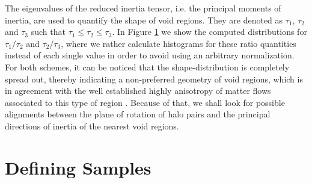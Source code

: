 \documentclass[a4,useAMS,usenatbib,usegraphicx]{latex/mn2e}
\begin{document}
\begin{flushleft}
\begin{figure}
\begin{center}

  \label{fig:distro_inertia}
  \vspace{0.1 cm}

\end{center}
\end{figure}
\end{flushleft}



The eigenvalues of the reduced inertia tensor, i.e. the principal moments
of inertia, are used to quantify the shape of void regions. They are 
denoted as $\tau_1$, $\tau_2$ and $\tau_3$ such that $\tau_1 \leq \tau_2
\leq \tau_3$. In Figure \ref{fig:distro_inertia} we show the computed
distributions for $\tau_1/\tau_2$ and $\tau_2/\tau_3$, where we rather 
calculate histograms for these ratio quantities instead of each single 
value in order to avoid using an arbitrary normalization. For both schemes, 
it can be noticed that the shape-distribution is completely spread out, 
thereby indicating a non-preferred geometry of void regions, which is in 
agreement with the well established highly anisotropy of matter flows
associated to this type of region . Because of 
that, we shall look for possible alignments between the plane of rotation 
of halo pairs and the principal directions of inertia of the nearest void 
regions.

 


\section{Defining Samples}
\label{section:Def_Samples}
\end{document}
